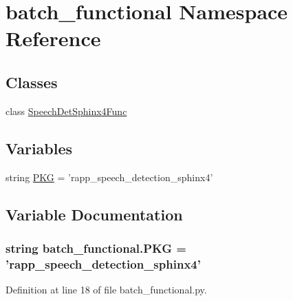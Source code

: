 \hypertarget{namespacebatch__functional}{\section{batch\-\_\-functional Namespace Reference}
\label{namespacebatch__functional}
}
\subsection*{Classes}
\begin{DoxyCompactItemize}
\item 
class \hyperlink{classbatch__functional_1_1SpeechDetSphinx4Func}{Speech\-Det\-Sphinx4\-Func}
\end{DoxyCompactItemize}
\subsection*{Variables}
\begin{DoxyCompactItemize}
\item 
string \hyperlink{namespacebatch__functional_a98876dd92a6e572b99657b19ffdd2b1f}{P\-K\-G} = 'rapp\-\_\-speech\-\_\-detection\-\_\-sphinx4'
\end{DoxyCompactItemize}


\subsection{Variable Documentation}
\hypertarget{namespacebatch__functional_a98876dd92a6e572b99657b19ffdd2b1f}{
\subsubsection[{P\-K\-G}]{\setlength{\rightskip}{0pt plus 5cm}string batch\-\_\-functional.\-P\-K\-G = 'rapp\-\_\-speech\-\_\-detection\-\_\-sphinx4'}}\label{namespacebatch__functional_a98876dd92a6e572b99657b19ffdd2b1f}


Definition at line 18 of file batch\-\_\-functional.\-py.

